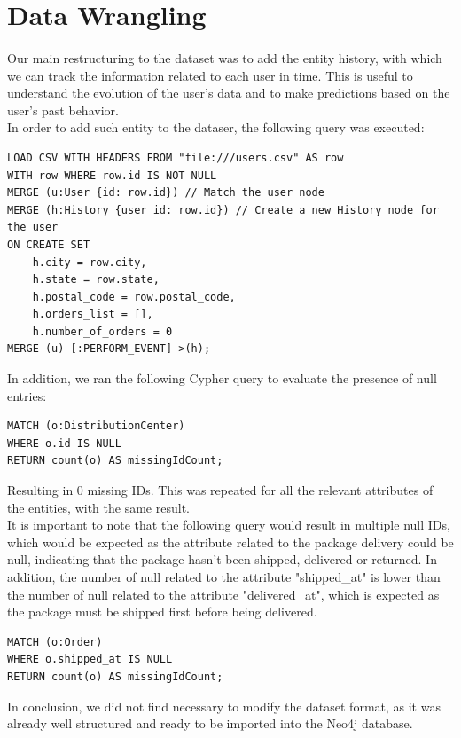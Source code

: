 \documentclass[a4paper,12pt]{article}
\begin{document}
\section{Data Wrangling}
\paragraph{} Our main restructuring to the dataset was to add the entity history, with which we can track the information related to each user in time. This is useful to understand the evolution of the user's data and to make predictions based on the user's past behavior.
\\
In order to add such entity to the dataser, the following query was executed:
\begin{verbatim}
LOAD CSV WITH HEADERS FROM "file:///users.csv" AS row
WITH row WHERE row.id IS NOT NULL
MERGE (u:User {id: row.id}) // Match the user node
MERGE (h:History {user_id: row.id}) // Create a new History node for the user
ON CREATE SET 
    h.city = row.city,
    h.state = row.state,
    h.postal_code = row.postal_code,
    h.orders_list = [], 
    h.number_of_orders = 0
MERGE (u)-[:PERFORM_EVENT]->(h);
\end{verbatim}

In addition, we ran the following Cypher query to evaluate the presence of null entries:
\begin{verbatim}
MATCH (o:DistributionCenter)
WHERE o.id IS NULL
RETURN count(o) AS missingIdCount;
\end{verbatim}

Resulting in 0 missing IDs. This was repeated for all the relevant attributes of the entities, with the same result.
\\
It is important to note that the following query would result in multiple null IDs, which would be expected as the attribute related to the package delivery could be null, indicating that the package hasn't been shipped, delivered or returned. 
In addition, the number of null related to the attribute "shipped\_at" is lower than the number of null related to the attribute "delivered\_at", which is expected as the package must be shipped first before being delivered.
\begin{verbatim}
MATCH (o:Order)
WHERE o.shipped_at IS NULL
RETURN count(o) AS missingIdCount;
\end{verbatim}
In conclusion, we did not find necessary to modify the dataset format, as it was already well structured and ready to be imported into the Neo4j database. 
\end{document}
